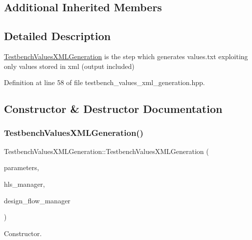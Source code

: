 \subsection*{Additional Inherited Members}


\subsection{Detailed Description}
\hyperlink{classTestbenchValuesXMLGeneration}{Testbench\+Values\+X\+M\+L\+Generation} is the step which generates values.\+txt exploiting only values stored in xml (output included) 

Definition at line 58 of file testbench\+\_\+values\+\_\+xml\+\_\+generation.\+hpp.



\subsection{Constructor \& Destructor Documentation}
\mbox{\label{classTestbenchValuesXMLGeneration_a47d557a2a6cc2411acd6bfdf440ceb78}} 
\subsubsection{\texorpdfstring{Testbench\+Values\+X\+M\+L\+Generation()}{TestbenchValuesXMLGeneration()}}
{\footnotesize\ttfamily Testbench\+Values\+X\+M\+L\+Generation\+::\+Testbench\+Values\+X\+M\+L\+Generation (\begin{DoxyParamCaption}\item[{const \hyperlink{Parameter_8hpp_a37841774a6fcb479b597fdf8955eb4ea}{Parameter\+Const\+Ref}}]{parameters,  }\item[{const \hyperlink{hls__manager_8hpp_acd3842b8589fe52c08fc0b2fcc813bfe}{H\+L\+S\+\_\+manager\+Ref}}]{hls\+\_\+manager,  }\item[{const Design\+Flow\+Manager\+Const\+Ref}]{design\+\_\+flow\+\_\+manager }\end{DoxyParamCaption})}



Constructor. 


